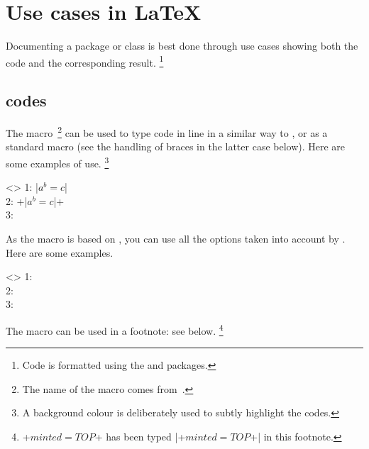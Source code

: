 \section{Use cases in \LaTeX}
\label{tutodoc-listing-latex}

Documenting a package or class is best done through use cases showing both the code and the corresponding result.%
\footnote{
    Code is formatted using the  and  packages.
}


\subsection{ codes}
\label{tutodoc-listing-latex-inline}

\begin{tdocexa}
    The  macro\,%
    \footnote{
        The name of the macro  comes from \,.
    }
    can be used to type code in line in a similar way to , or as a standard macro (see the handling of braces in the latter case below).
    Here are some examples of use.%
    \footnote{
    	A background colour is deliberately used to subtly highlight the \tdoclatexin{\LaTeX} codes.
    }

    \begin{tdoclatex}<>
1: \tdoclatexin|$a^b = c$|               \\
2: \tdoclatexin+\tdoclatexin|$a^b = c$|+ \\
3: 
	\end{tdoclatex}
\end{tdocexa}


\begin{tdocexa}
    As the  macro is based on , you can use all the options taken into account by .
    Here are some examples.

    \begin{tdoclatex}<>
1:              \\
2:  \\
3: 
	\end{tdoclatex}
\end{tdocexa}


\begin{tdocnote}
    The  macro can be used in a footnote: see below.%
    \footnote{
        \tdoclatexin+$minted = TOP$+ has been typed \tdoclatexin|\tdoclatexin+$minted = TOP$+| in this footnote.
    }
\end{tdocnote}


